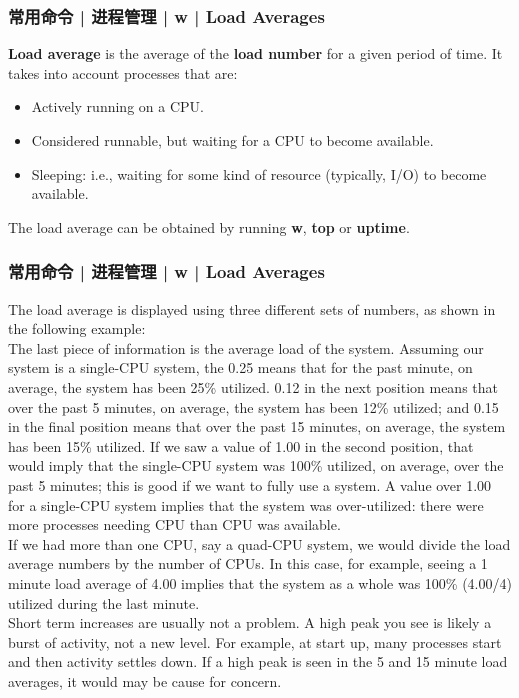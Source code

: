 \begin{frame}
  \frametitle{常用命令 | 进程管理 | w | Load Averages}
  \textbf{Load average} is the average of the \textbf{load number} for a given period of time. It takes into account processes that are:
  \begin{itemize}
    \item Actively running on a CPU.
    \item Considered runnable, but waiting for a CPU to become available.
    \item Sleeping: i.e., waiting for some kind of resource (typically, I/O) to become available.
  \end{itemize}
  The load average can be obtained by running \textbf{w}, \textbf{top} or \textbf{uptime}.
\end{frame}

\begin{frame}
  \frametitle{常用命令 | 进程管理 | w | Load Averages}
  {\footnotesize
  The load average is displayed using three different sets of numbers, as shown in the following example:\\
  \vspace{0.1cm}
  The last piece of information is the average load of the system.  Assuming our system is a single-CPU system, the 0.25 means that for the past minute, on average, the system has been 25\% utilized. 0.12 in the next position means that over the past 5 minutes, on average, the system has been 12\% utilized; and 0.15 in the final position means that over the past 15 minutes, on average, the system has been 15\% utilized. If we saw a value of 1.00 in the second position, that would imply that the single-CPU system was 100\% utilized, on average, over the past 5 minutes; this is good if we want to fully use a system. A value over 1.00 for a single-CPU system implies that the system was over-utilized: there were more processes needing CPU than CPU was available.\\
  \vspace{0.1cm}
  If we had more than one CPU, say a quad-CPU system, we would divide the load average numbers by the number of CPUs. In this case, for example, seeing a 1 minute load average of 4.00 implies that the system as a whole was 100\% (4.00/4) utilized during the last minute.\\ 
  \vspace{0.1cm}
  Short term increases are usually not a problem. A high peak you see is likely a burst of activity, not a new level. For example, at start up, many processes start and then activity settles down. If a high peak is seen in the 5 and 15 minute load averages, it would may be cause for concern.\\
  }
\end{frame}

